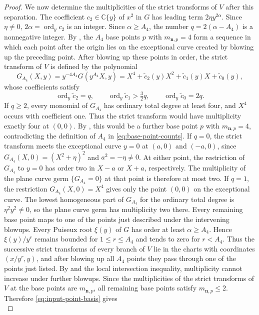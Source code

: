 \documentclass[11pt,letterpaper]{article}
\numberwithin{equation}{section}
\theoremstyle{remark}
\theoremstyle{plain}
\newcommand{\C}{\mathbb{C}}
\newcommand{\ord}{\operatorname{ord}}
\begin{document}
\begin{proof}
We now determine the multiplicities of the strict transforms of $V$
after this separation.
The coefficient $c_2\in\C\{y\}$ of $x^2$ in $G$ has leading term
$2\eta y^{2\alpha}$.  Since $\eta\neq0$, $2\alpha=\ord_yc_2$ is an integer.
Since $\alpha\geq A_4$, the number $q=2(\alpha-A_4)$ is a
nonnegative integer.  By , the $A_4$ base points $p$
with $m_{\boldsymbol n,p}=4$ form a sequence in which each point after
the origin lies on the exceptional curve created by blowing up the
preceding point.  After blowing up these points in order, the strict
transform of $V$ is defined by the polynomial
\[
 G_{A_4}(X,y)=y^{-4A_4}G(y^{A_4}X,y)
 =X^4+\widetilde c_2(y)X^2+\widetilde c_1(y)X+\widetilde c_0(y),
\]
whose coefficients satisfy
\[
 \ord_y\widetilde c_2=q,\qquad
 \ord_y\widetilde c_1>\tfrac32q,\qquad
 \ord_y\widetilde c_0=2q.
\]
If $q\geq2$, every monomial of $G_{A_4}$ has ordinary total
degree at least four, and $X^4$ occurs with coefficient one.
Thus the strict transform would have multiplicity exactly four at
$(0,0)$.  By , this would be a further base point $p$
with $m_{\boldsymbol n,p}=4$, contradicting the definition of $A_4$
in \eqref{eq:base-point-counts}.
If $q=0$, the strict transform meets the exceptional curve $y=0$
at $(a,0)$ and $(-a,0)$, since
$G_{A_4}(X,0)=(X^2+\eta)^2$ and $a^2=-\eta\neq0$.
At either point, the restriction of $G_{A_4}$ to $y=0$ has order two in
$X-a$ or $X+a$, respectively.  The multiplicity of the plane
curve germ $\{G_{A_4}=0\}$ at that point is therefore at
most two.
If $q=1$, the restriction $G_{A_4}(X,0)=X^4$ gives only the
point $(0,0)$ on the exceptional curve.  The lowest homogeneous
part of $G_{A_4}$ for the ordinary total degree is
$\eta^2y^2\neq0$, so the plane curve germ has multiplicity two there.
Every remaining base point maps to one of the points just described
under the intervening blowups.
Every Puiseux root $\xi(y)$ of $G$ has order at least $\alpha\geq A_4$.
Hence $\xi(y)/y^r$ remains bounded for $1\leq r\leq A_4$ and
tends to zero for $r<A_4$.  Thus the successive strict transforms of
every branch of $V$ lie in the charts with coordinates $(x/y^r,y)$,
and after blowing up all $A_4$ points they pass through one of the
points just listed.
By \cite[Lemma~3.4.2]{Wall} and the local intersection inequality,
multiplicity cannot increase under further blowups.  Since the
multiplicities of the strict transforms of $V$ at the base points are
$m_{\boldsymbol n,p}$, all remaining base points satisfy
$m_{\boldsymbol n,p}\leq2$.  Therefore
\eqref{eq:input-point-basis} gives
\begin{equation}

\end{equation}
\end{proof}
\end{document}
